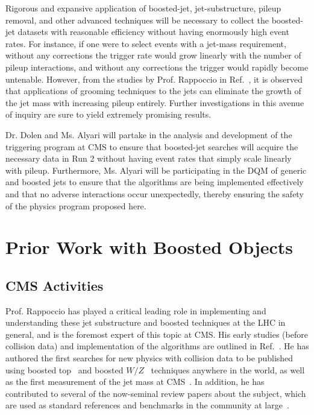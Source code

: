 \documentclass[12pt]{proposalnsf}
\begin{document}
Rigorous and
expansive application of boosted-jet, jet-substructure, pileup
removal, and other advanced techniques
will be necessary to collect the boosted-jet datasets with reasonable
efficiency without having enormously high event rates. For instance,
if one were to select events with a jet-mass requirement, without any
corrections the trigger rate would grow linearly with the number of
pileup interactions, and without any corrections the trigger would
rapidly become untenable. However, from the studies by Prof. Rappoccio in
Ref.~\cite{SMP-12-019}, it is observed that applications of grooming
techniques to the jets can eliminate the growth of the jet mass with
increasing pileup entirely. Further investigations in this avenue of
inquiry are sure to yield extremely promising results. 


Dr. Dolen and Ms. Alyari will partake in the analysis and development
of the triggering program at CMS to ensure that boosted-jet searches
will acquire the necessary data in Run 2 without having event rates
that simply scale linearly with pileup. 
Furthermore, Ms. Alyari will be participating in the DQM of generic
and boosted jets to ensure that the algorithms are being implemented
effectively and that no adverse interactions occur unexpectedly,
thereby ensuring the safety of the physics program proposed here. 






\section{Prior Work with Boosted Objects}

\subsection{CMS Activities}

Prof. Rappoccio has played a critical leading role in implementing and
understanding these jet substructure and boosted techniques at the LHC
in general, and is the foremost expert of this topic at CMS.
His early studies (before collision data) and
implementation of the algorithms are outlined in
Ref.~\cite{catop_cms}. He has authored the first searches
for new physics with collision data to be published using boosted
top~\cite{EXO-11-006} and boosted $W/Z$~\cite{EXO-11-095} techniques
anywhere in the world, as well as the first measurement of the jet
mass at CMS~\cite{SMP-12-019}. In addition, he has contributed to
several of the now-seminal review papers about the subject, which are
used as standard references and benchmarks in the community at
large~\cite{boost2010,boost2011}. 
\end{document}
